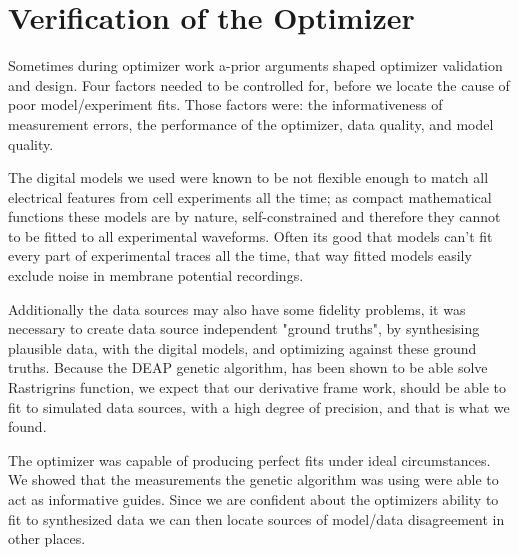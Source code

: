 \section{Verification of the Optimizer}
\label{sec:optimizer-verification}
Sometimes during optimizer work a-prior arguments shaped optimizer validation and design.
Four factors needed to be controlled for, before we locate the cause of poor model/experiment fits. Those factors were: the informativeness of measurement errors, the performance of the optimizer, data quality, and model quality.

The digital models we used were known to be not flexible enough to match all electrical features from cell experiments all the time; as compact mathematical functions these models are by nature, self-constrained and therefore they cannot to be fitted to all experimental waveforms. Often its good that models can't fit every part of experimental traces all the time, that way fitted models easily exclude noise in membrane potential recordings.

Additionally the data sources may also have some fidelity problems, it was necessary to create data source independent "ground truths", by synthesising plausible data, with the digital models, and optimizing against these ground truths. Because the DEAP genetic algorithm, has been shown to be able solve Rastrigrins function, we expect that our derivative frame work, should be able to fit to simulated data sources, with a high degree of precision, and that is what we found.

The optimizer was capable of producing perfect fits under ideal circumstances. We showed that the measurements the genetic algorithm was using were able to act as informative guides. Since we are confident about the optimizers ability to fit to synthesized data we can then locate sources of model/data disagreement in other places. 

